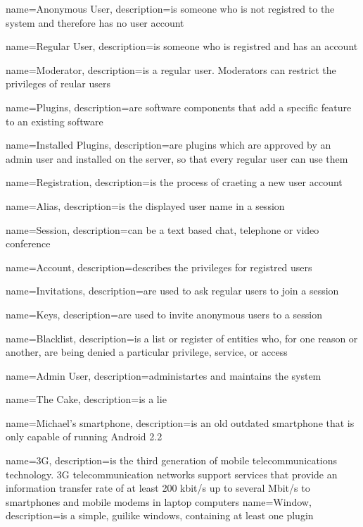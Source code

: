 {
  name=Anonymous User,
  description={is someone who is not registred to the system and therefore has no user account}
}

{
  name=Regular User,
  description={is someone who is registred and has an account}
}

{
  name=Moderator,
  description={is a regular user. Moderators can restrict the privileges of reular users}
}

{
  name=Plugins,
  description={are software components that add a specific feature to an existing software}
}

{
  name=Installed Plugins,
  description={are plugins which are approved by an admin user and installed on the server, so that every regular user can use them}
}

{
  name=Registration,
  description={is the process of craeting a new user account}
}

{
  name=Alias,
  description={is the displayed user name in a session}
}

{
  name=Session,
  description={can be a text based chat, telephone or video conference}
}

{
  name=Account,
  description={describes the privileges for registred users}
}

{
  name=Invitations,
  description={are used to ask regular users to join a session}
}

{
  name=Keys,
  description={are used to invite anonymous users to a session}
}

{
  name=Blacklist,
  description={is a list or register of entities who, for one reason or another, are being denied a particular privilege, service, or access}
}

{
  name=Admin User,
  description={administartes and maintains the system}
}

{
  name=The Cake,
  description={is a lie}
}

{
  name=Michael's smartphone,
  description={is an old outdated smartphone that is only capable of running Android 2.2}
}

{
  name=3G,
  description={is the third generation of mobile telecommunications technology. 3G telecommunication networks support services that provide an information transfer rate of at least 200 kbit/s up to several Mbit/s to smartphones and mobile modems in laptop computers}
}
{
  name=Window,
  description={is a simple, guilike windows, containing at least one plugin}
}

